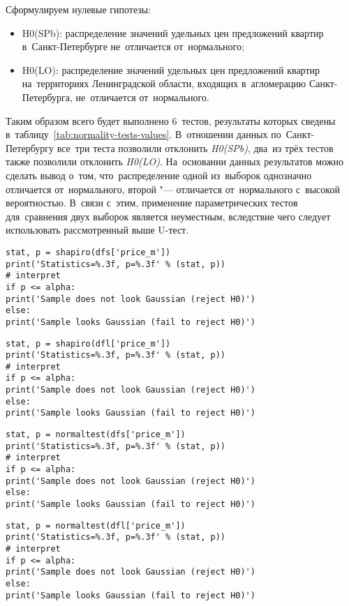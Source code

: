 \documentclass[]{scrreprt}
\begin{document}
Сформулируем нулевые гипотезы:
\begin{itemize}
	\item H0(SPb): распределение значений удельных цен предложений квартир в~Санкт-Петербурге не~отличается от~нормального;
	\item H0(LO): распределение значений удельных цен предложений квартир на~территориях Ленинградской области, входящих в~агломерацию Санкт-Петербурга, не~отличается от~нормального.
\end{itemize}
Таким образом всего будет выполнено 6~тестов, результаты которых сведены в~таблицу~\ref{tab:normality-tests-values}. В~отношении данных по~Санкт-Петербургу все~три теста позволили отклонить \emph{H0(SPb)}, два~из трёх тестов также позволили отклонить \emph{H0(LO)}. На~основании данных результатов можно сделать вывод о~том, что~распределение одной из~выборок однозначно отличается от~нормального, второй "--- отличается от~нормального с~высокой вероятностью. В~связи с~этим, применение параметрических тестов для~сравнения двух выборок является неуместным, вследствие чего следует использовать рассмотренный выше U-тест.
\begin{lstlisting}[float, caption = Тест Шапиро-Уилка для~данных по~Санкт-Петербургу, firstnumber=1, label= lst:shapiro-wilk-test-spb]
stat, p = shapiro(dfs['price_m'])
print('Statistics=%.3f, p=%.3f' % (stat, p))
# interpret
if p <= alpha:
print('Sample does not look Gaussian (reject H0)')
else:
print('Sample looks Gaussian (fail to reject H0)')
\end{lstlisting}
%
\begin{lstlisting}[float, caption = Тест Шапиро-Уилка для~данных по~Ленинградской области, firstnumber=1, label= lst:shapiro-wilk-test-lo]
stat, p = shapiro(dfl['price_m'])
print('Statistics=%.3f, p=%.3f' % (stat, p))
# interpret
if p <= alpha:
print('Sample does not look Gaussian (reject H0)')
else:
print('Sample looks Gaussian (fail to reject H0)')
\end{lstlisting}  
%
\begin{lstlisting}[float, caption = Тест K2 Агостино для~данных по~Санкт-Петербургу, firstnumber=1, label= lst:K^2-D'Agostino-test-spb]
stat, p = normaltest(dfs['price_m'])
print('Statistics=%.3f, p=%.3f' % (stat, p))
# interpret
if p <= alpha:
print('Sample does not look Gaussian (reject H0)')
else:
print('Sample looks Gaussian (fail to reject H0)')
\end{lstlisting}
%
\begin{lstlisting}[float, caption = Тест K2 Агостино для~данных по~Ленинградской области, firstnumber=1, label= lst:K^2-D'Agostino-test-lo]
stat, p = normaltest(dfl['price_m'])
print('Statistics=%.3f, p=%.3f' % (stat, p))
# interpret
if p <= alpha:
print('Sample does not look Gaussian (reject H0)')
else:
print('Sample looks Gaussian (fail to reject H0)')
\end{lstlisting}  
\end{document}
